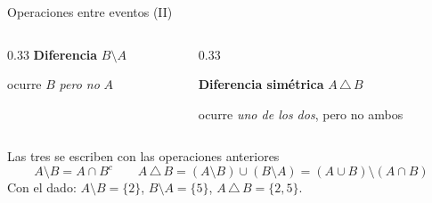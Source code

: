\documentclass[aspectratio=169,10pt]{beamer}
\begin{document}
\begin{frame}{Operaciones entre eventos (II)}
\begin{columns}[T,onlytextwidth]
\begin{column}{0.33\textwidth}
      \textbf{Diferencia} $B\setminus A$\par
      {\scriptsize ocurre $B$ \emph{pero no} $A$}
    \end{column}
    \begin{column}{0.33\textwidth}
      \centering
      \par\vspace{0.15cm}
      \textbf{Diferencia simétrica} $A\,\triangle\,B$\par
      {\scriptsize ocurre \emph{uno de los dos}, pero no ambos}
    \end{column}
  \end{columns}

  \vspace{0.35cm}
  \begin{exampleblock}{Las tres se escriben con las operaciones anteriores}
    \[ A\setminus B = A\cap B^{c} \qquad
       A\,\triangle\,B = (A\setminus B)\cup(B\setminus A)
                       = (A\cup B)\setminus(A\cap B) \]
    Con el dado: $A\setminus B=\{2\}$, \; $B\setminus A=\{5\}$, \;
    $A\,\triangle\,B=\{2,5\}$.
  \end{exampleblock}
\end{frame}
\end{document}
